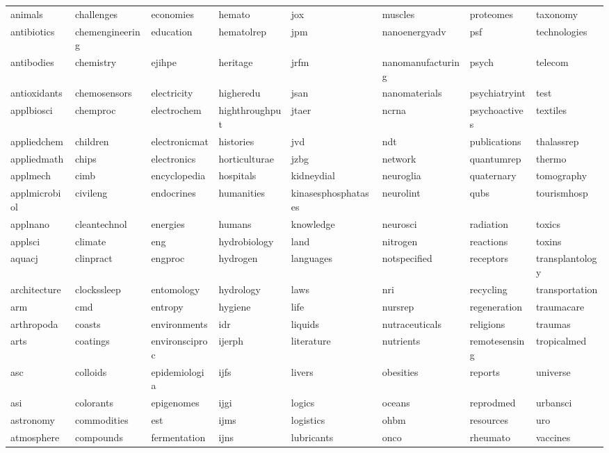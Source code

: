 \documentclass[notspecified,article,submit,moreauthors,pdftex]{Definitions/mdpi}
\begin{document}
\begin{longtable}[t]{llllllll}
animals & challenges & economies & hemato & jox & muscles & proteomes & taxonomy\\
\addlinespace
antibiotics & chemengineering & education & hematolrep & jpm & nanoenergyadv & psf & technologies\\
antibodies & chemistry & ejihpe & heritage & jrfm & nanomanufacturing & psych & telecom\\
antioxidants & chemosensors & electricity & higheredu & jsan & nanomaterials & psychiatryint & test\\
applbiosci & chemproc & electrochem & highthroughput & jtaer & ncrna & psychoactives & textiles\\
appliedchem & children & electronicmat & histories & jvd & ndt & publications & thalassrep\\
\addlinespace
appliedmath & chips & electronics & horticulturae & jzbg & network & quantumrep & thermo\\
applmech & cimb & encyclopedia & hospitals & kidneydial & neuroglia & quaternary & tomography\\
applmicrobiol & civileng & endocrines & humanities & kinasesphosphatases & neurolint & qubs & tourismhosp\\
applnano & cleantechnol & energies & humans & knowledge & neurosci & radiation & toxics\\
applsci & climate & eng & hydrobiology & land & nitrogen & reactions & toxins\\
\addlinespace
aquacj & clinpract & engproc & hydrogen & languages & notspecified & receptors & transplantology\\
architecture & clockssleep & entomology & hydrology & laws & nri & recycling & transportation\\
arm & cmd & entropy & hygiene & life & nursrep & regeneration & traumacare\\
arthropoda & coasts & environments & idr & liquids & nutraceuticals & religions & traumas\\
arts & coatings & environsciproc & ijerph & literature & nutrients & remotesensing & tropicalmed\\
\addlinespace
asc & colloids & epidemiologia & ijfs & livers & obesities & reports & universe\\
asi & colorants & epigenomes & ijgi & logics & oceans & reprodmed & urbansci\\
astronomy & commodities & est & ijms & logistics & ohbm & resources & uro\\
atmosphere & compounds & fermentation & ijns & lubricants & onco & rheumato & vaccines\\

\end{longtable}
\end{document}
